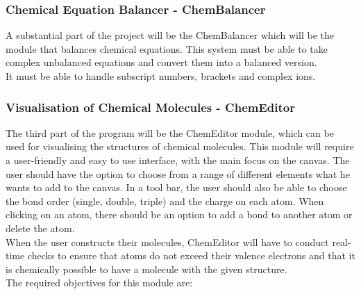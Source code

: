 \documentclass[a4paper,12pt]{article}
\begin{document}
\newpage

\subsubsection{Chemical Equation Balancer - ChemBalancer}

A substantial part of the project will be the ChemBalancer which will be the module that balances chemical equations. This system must be able to take complex unbalanced equations and convert them into a balanced version.\\
It must be able to handle subscript numbers, brackets and complex ions.

\subsubsection{Visualisation of Chemical Molecules - ChemEditor}

The third part of the program will be the ChemEditor module, which can be used for visualising the structures of chemical molecules. This module will require a user-friendly and easy to use interface, with the main focus on the canvas. The user should have the option to choose from a range of different elements what he wants to add to the canvas. In a tool bar, the user should also be able to choose the bond order (single, double, triple) and the charge on each atom. When clicking on an atom, there should be an option to add a bond to another atom or delete the atom.\\
When the user constructs their molecules, ChemEditor will have to conduct real-time checks to ensure that atoms do not exceed their valence electrons and that it is chemically possible to have a molecule with the given structure. \\
The required objectives for this module are:\\
\end{document}
